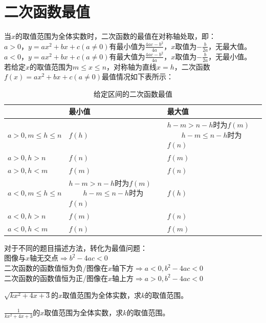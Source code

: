 \section{二次函数最值}
\begin{theorem}
    当$x$的取值范围为全体实数时，二次函数的最值在对称轴处取，即：\\
    $a>0$，$y=ax^2+bx+c(a\ne 0)$有最小值为$\frac{4ac-b^2}{4a}$，$x$取值为$-\frac{b}{2a}$，无最大值。\\
    $a<0$，$y=ax^2+bx+c(a\ne 0)$有最大值为$\frac{4ac-b^2}{4a}$，$x$取值为$-\frac{b}{2a}$，无最小值。 \\
    若给定$x$的取值范围为$m \le x \le n$，对称轴为直线$x=h$，二次函数$f(x)=ax^2+bx+c(a\ne 0)$最值情况如下表所示：
\end{theorem}
\begin{table}[H]
    \centering
    \caption{给定区间的二次函数最值}
    \begin{tabular}{l|p{5cm}|p{5cm}}
        \hline
        \hline
                             & 最小值                                           & 最大值                                           \\
        \hline
        $a>0, m \le h \le n$ & $f(h)$                                        & $h-m>n-h$时为$f(m)$ $\qquad h-m\le n-h$时为$f(n)$ \\
        $a>0, h > n$         & $f(n)$                                        & $f(m)$                                        \\
        $a>0, h < m$         & $f(m)$                                        & $f(n)$                                        \\
        $a<0, m \le h \le n$ & $h-m>n-h$时为$f(m)$ $\qquad h-m\le n-h$时为$f(n)$ & $f(h)$                                        \\
        $a<0, h > n$         & $f(m)$                                        & $f(n)$                                        \\
        $a<0, h < m$         & $f(n)$                                        & $f(m)$                                        \\
        \hline
        \hline
    \end{tabular}
\end{table}
\begin{theorem}
    对于不同的题目描述方法，转化为最值问题：\\
    图像与$x$轴无交点$\Rightarrow b^2-4ac<0$ \\
    二次函数的函数值恒为负/图像在$x$轴下方$\Rightarrow a<0, b^2-4ac < 0$ \\
    二次函数的函数值恒为正/图像在$x$轴上方$\Rightarrow a>0, b^2-4ac < 0$
\end{theorem}
\begin{problem}
$\sqrt{kx^2+4x+3}$的$x$取值范围为全体实数，求$k$的取值范围。
\end{problem}
\begin{problem}
$\frac{1}{kx^2+4x+3}$的$x$取值范围为全体实数，求$k$的取值范围。
\end{problem}
\clearpage
